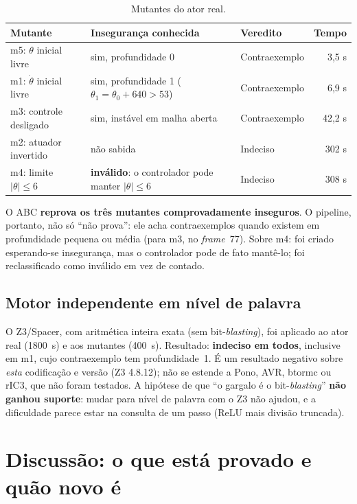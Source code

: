 \documentclass[12pt,openright,oneside,a4paper,chapter=TITLE,sumario=tradicional,english,brazil]{abntex2}
\begin{document}
\begin{table}[htb]
\caption{Mutantes do ator real.}\label{tab:mut}
\centering
\begin{tabular}{p{3.6cm}|p{4.2cm}|p{3.0cm}|r}
\toprule
\textbf{Mutante} & \textbf{Insegurança conhecida} & \textbf{Veredito} & \textbf{Tempo} \\
\midrule
m5: $\theta$ inicial livre & sim, profundidade 0 & Contraexemplo & 3,5 s \\
m1: $\dot\theta$ inicial livre & sim, profundidade 1 ($\theta_1=\theta_0+640>53$) & Contraexemplo & 6,9 s \\
m3: controle desligado & sim, instável em malha aberta & Contraexemplo & 42,2 s \\
m2: atuador invertido & não sabida & Indeciso & 302 s \\
m4: limite $|\theta|\le6$ & \textbf{inválido}: o controlador pode manter $|\theta|\le6$ & Indeciso & 308 s \\
\bottomrule
\end{tabular}
\end{table}

O ABC \textbf{reprova os três mutantes comprovadamente inseguros}. O pipeline, portanto, não só ``não prova'': ele acha contraexemplos quando existem em profundidade pequena ou média (para m3, no \emph{frame}~77). Sobre m4: foi criado esperando-se insegurança, mas o controlador pode de fato mantê-lo; foi reclassificado como inválido em vez de contado.

\section{Motor independente em nível de palavra}

O Z3/Spacer, com aritmética inteira exata (sem bit-\emph{blasting}), foi aplicado ao ator real (1800~s) e aos mutantes (400~s). Resultado: \textbf{indeciso em todos}, inclusive em m1, cujo contraexemplo tem profundidade~1. É um resultado negativo sobre \emph{esta} codificação e versão (Z3 4.8.12); não se estende a Pono, AVR, btormc ou rIC3, que não foram testados. A hipótese de que ``o gargalo é o bit-\emph{blasting}'' \textbf{não ganhou suporte}: mudar para nível de palavra com o Z3 não ajudou, e a dificuldade parece estar na consulta de um passo (ReLU mais divisão truncada).

\chapter{Discussão: o que está provado e quão novo é}\label{cap:disc}
\end{document}
